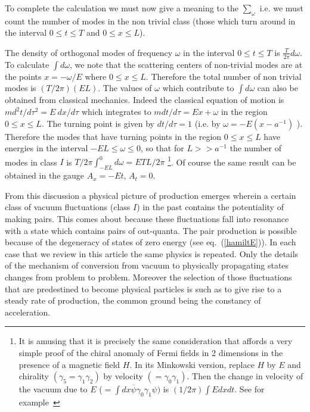 \documentclass[12pt,oneside]{report}
\begin{document}
To complete the calculation
we must now give a meaning to the $\sum_\omega$ i.e.
we must count the number of modes in the non trivial class (those
which turn around in the interval $0 \leq t \leq T$ and $0 \leq x \leq L$).
\par The density of orthogonal modes of frequency
$\omega$ in the interval $0 \leq t \leq T$ is
$\frac{T}{2\pi} d\omega$.  To calculate $\int d\omega$, we note
that the scattering centers of non-trivial modes are at the points
$x = -\omega/E$ 
where $0 \leq x \leq L$.  Therefore the total number of
non trivial modes is $(T/2\pi)(EL)$.  
The values of $\omega$ which contribute to $\int d\omega$ can also be 
obtained from classical mechanics. Indeed the classical equation 
of motion is
$m d^2t /d\tau^2=E\ dx/d\tau $ which
integrates to $mdt/d\tau=Ex + \omega $ in the region $ 0\leq x\leq
L$. 
The turning point is given by 
$dt/d\tau = 1$ (i.e. by $\omega = - E( x - a^{-1})$ ). Therefore
 the modes that have turning points in the region $ 0\leq x\leq
L$ have energies in the interval $-EL \leq \omega \leq 0$, 
so that for $L>>a^{-1}$ the number of modes in class $I$ 
is $T/{2\pi} \int_{-EL}^{0} d\omega =  ETL/2\pi$ \footnote{It is amusing that
it is precisely the same consideration that affords
a very simple proof of the chiral anomaly of Fermi fields in 2 dimensions
in the presence of a magnetic field $H$. 
 In its Minkowski version, replace $H$ by $E$ and chirality
$(\gamma_5 = \gamma_1\gamma_2)$ by velocity $(= \gamma_0 \gamma_1)$.  Then
the change in velocity of the vacuum due to $E$ ($= \int dx 
\overline \psi \gamma_0 \gamma_1 \psi)$ is $(1/2\pi) \int Edxdt$. See for 
example~\cite{Nien}}.
 Of course the same result can be obtained
in the gauge $A_x =- Et$, $A_t = 0$.  
\par From this discussion
 a physical picture of production emerges
wherein a certain class of vacuum fluctuations (class $I$) in the past
contains the potentiality of making pairs. This comes about because 
these fluctuations fall into resonance with a state  which contains pairs
of out-quanta. The pair production is possible because of the degeneracy of
states of zero energy (see eq.~(\ref{hamiltE})).
 In each case
that we review in this article the same physics is repeated.  Only the
details of the mechanism of conversion from vacuum to  physically
propagating states
changes from problem to problem. Moreover
the selection of those fluctuations that are predestined to become
physical particles 
is such as to give rise to a steady rate of
production, the common ground being the constancy of acceleration.
\end{document}
